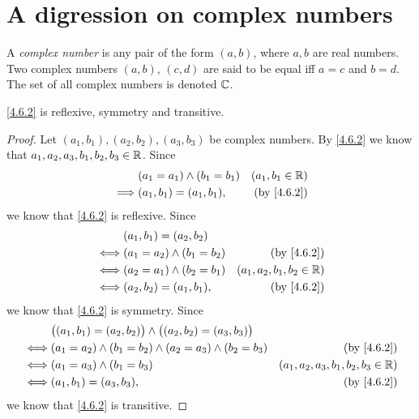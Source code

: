 \section{A digression on complex numbers}\label{sec:4.6}

\setcounter{thm}{1}
\begin{defn}\label{4.6.2}
  A \emph{complex number} is any pair of the form \((a, b)\), where \(a, b\) are real numbers.
  Two complex numbers \((a, b)\), \((c, d)\) are said to be equal iff \(a = c\) and \(b = d\).
  The set of all complex numbers is denoted \(\mathbb{C}\).
\end{defn}

\begin{ac}\label{ac:4.6.1}
  \cref{4.6.2} is reflexive, symmetry and transitive.
\end{ac}

\begin{proof}
  Let \((a_1, b_1), (a_2, b_2), (a_3, b_3)\) be complex numbers.
  By \cref{4.6.2} we know that \(a_1, a_2, a_3, b_1, b_2, b_3 \in \mathbb{R}\).
  Since
  \begin{align*}
             & (a_1 = a_1) \land (b_1 = b_1) & (a_1, b_1 \in \R)        \\
    \implies & (a_1, b_1) = (a_1, b_1),      & \text{(by \cref{4.6.2})}
  \end{align*}
  we know that \cref{4.6.2} is reflexive.
  Since
  \begin{align*}
         & (a_1, b_1) = (a_2, b_2)                                     \\
    \iff & (a_1 = a_2) \land (b_1 = b_2) & \text{(by \cref{4.6.2})}    \\
    \iff & (a_2 = a_1) \land (b_2 = b_1) & (a_1, a_2, b_1, b_2 \in \R) \\
    \iff & (a_2, b_2) = (a_1, b_1),      & \text{(by \cref{4.6.2})}
  \end{align*}
  we know that \cref{4.6.2} is symmetry.
  Since
  \begin{align*}
         & \big((a_1, b_1) = (a_2, b_2)\big) \land \big((a_2, b_2) = (a_3, b_3)\big)                                         \\
    \iff & (a_1 = a_2) \land (b_1 = b_2) \land (a_2 = a_3) \land (b_2 = b_3)         & \text{(by \cref{4.6.2})}              \\
    \iff & (a_1 = a_3) \land (b_1 = b_3)                                             & (a_1, a_2, a_3, b_1, b_2, b_3 \in \R) \\
    \iff & (a_1, b_1) = (a_3, b_3),                                                  & \text{(by \cref{4.6.2})}
  \end{align*}
  we know that \cref{4.6.2} is transitive.
\end{proof}

